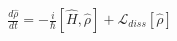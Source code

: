 \documentclass[preview]{standalone}
\begin{document}
\begin{align*}
\frac{d\hat{\rho}}{dt} = -\frac{i}{\hbar}[\hat{H}, \hat{\rho}] + \mathcal{L}_{diss}[\hat{\rho}]
\end{align*}
\end{document}

